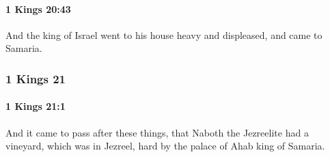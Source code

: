 		\paragraph{1 Kings 20:43} %
			\label{1KINGS-20-43}

			And the king of Israel went to his house heavy and displeased, and came to Samaria.

	\subsubsection{1 Kings 21} %
		\label{1KINGS-21}

		\paragraph{1 Kings 21:1} %
			\label{1KINGS-21-1}

			And it came to pass after these things, that Naboth the Jezreelite had a vineyard, which was in Jezreel, hard by the palace of Ahab king of Samaria.

